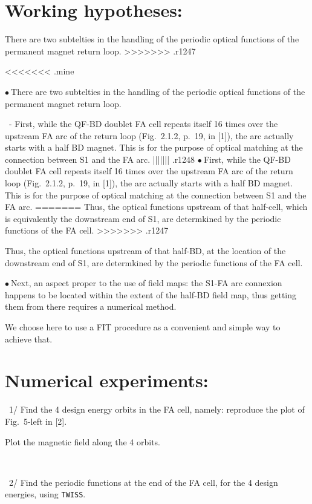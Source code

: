 \documentclass[10pt]{article}
\newcommand{\nib}{\noindent \ensuremath{\bullet~}}
\newcommand{\nin}{\noindent~}
\begin{document}
\section*{Working hypotheses:}

There are two subtelties in the handling of the periodic optical functions of the permanent magnet return loop.
>>>>>>> .r1247

<<<<<<< .mine
\smallskip

\nib There are two subtelties in the handling of the periodic optical functions of the permanent magnet return loop.

\nin - First, while the QF-BD doublet FA cell repeats itself 16 times over the upstream FA arc of the return loop (Fig.~2.1.2, p.~19, in [1]), the arc actually starts with a half BD magnet.
This is for the purpose of optical matching at the connection between S1 and the FA arc. 
||||||| .r1248
\nib First, while the QF-BD doublet FA cell repeats itself 16 times over the upstream FA arc of the return loop (Fig.~2.1.2, p.~19, in [1]), the arc actually starts with a half BD magnet.
This is for the purpose of optical matching at the connection between S1 and the FA arc. 
=======
Thus, the optical functions upstream of that half-cell, which is equivalently the downstream end of S1, are determkined by the periodic functions of
the FA cell.
>>>>>>> .r1247

Thus, the optical functions upstream of that half-BD, at the location of the downstream end of S1, are determkined by the periodic functions of the FA cell.

\nib Next, an aspect proper to the use of field maps:  the S1-FA arc connexion happens to be located within the extent of
the half-BD field map, thus getting them from there requires a numerical method.

We choose here to use a FIT procedure as a convenient and simple way to achieve that.



\section*{ Numerical experiments: }


\nin 1/ Find the 4 design energy orbits in the FA cell, namely: reproduce the plot of Fig.~5-left in [2]. 

Plot the magnetic field along the 4 orbits.

~

\nin 2/ Find the periodic functions at the end of the FA cell,
for the 4 design energies, using \texttt{TWISS}.
\end{document}
